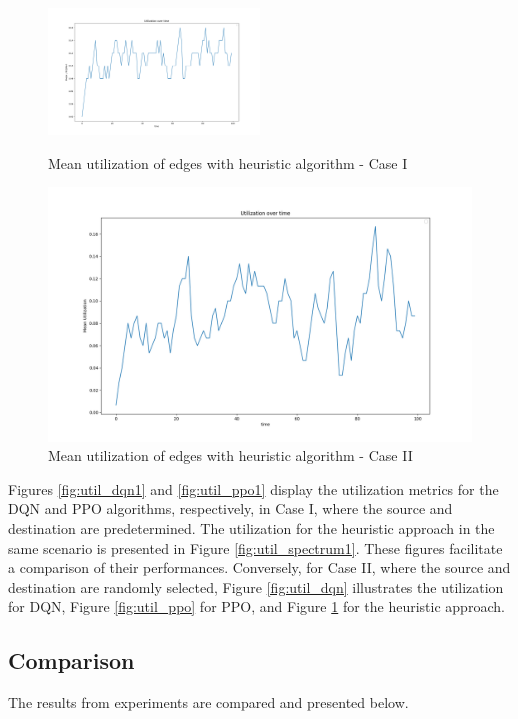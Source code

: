 \documentclass[conference]{IEEEtran}
\begin{document}
\begin{figure}[ht]
  \centering
  \includegraphics[width=0.5\textwidth]{util_spectrum1.png}
  \caption{Mean utilization of edges with heuristic algorithm - Case I}
  \label{fig:util_spectrum1}

  \includegraphics[width=\linewidth]{util_spectrum.png}
  \caption{Mean utilization of edges with heuristic algorithm - Case II}
  \label{fig:util_spectrum}
\end{figure}

Figures \ref{fig:util_dqn1} and \ref{fig:util_ppo1} display the utilization metrics for the DQN and PPO algorithms, respectively, in Case I, where the source and destination are predetermined. The utilization for the heuristic approach in the same scenario is presented in Figure \ref{fig:util_spectrum1}. These figures facilitate a comparison of their performances. Conversely, for Case II, where the source and destination are randomly selected, Figure \ref{fig:util_dqn} illustrates the utilization for DQN, Figure \ref{fig:util_ppo} for PPO, and Figure \ref{fig:util_spectrum} for the heuristic approach. 


\subsection{Comparison}
The results from experiments are compared and presented below.
\end{document}
